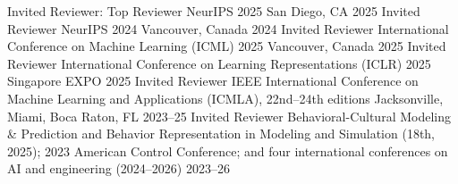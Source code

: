 


\begin{cvhonors}
\cvhonor
{Invited Reviewer: Top Reviewer} %
{NeurIPS 2025} %
{San Diego, CA} %
{2025} %
\cvhonor
{Invited Reviewer} %
{NeurIPS 2024} %
{Vancouver, Canada} %
{2024} %
\cvhonor
{Invited Reviewer} %
{International Conference on Machine Learning (ICML) 2025} %
{Vancouver, Canada} %
{2025} %
\cvhonor
{Invited Reviewer} %
{International Conference on Learning Representations (ICLR) 2025} %
{Singapore EXPO} %
{2025} %
\cvhonor
{Invited Reviewer} %
{IEEE International Conference on Machine Learning and Applications (ICMLA), 22nd--24th editions} %
{Jacksonville, Miami, Boca Raton, FL} %
{2023--25} %
\cvhonor
{Invited Reviewer} %
{Behavioral-Cultural Modeling \& Prediction and Behavior Representation in Modeling and Simulation (18th, 2025); 2023 American Control Conference; and four international conferences on AI and engineering (2024--2026)} %
{} %
{2023--26} %
\end{cvhonors}
